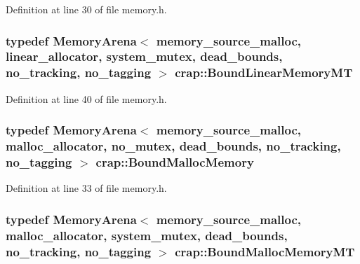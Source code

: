 Definition at line 30 of file memory.\+h.

\hypertarget{namespacecrap_a55259fc8a1932b947a5b796be2f346dc}{
\subsubsection[{Bound\+Linear\+Memory\+M\+T}]{\setlength{\rightskip}{0pt plus 5cm}typedef {\bf Memory\+Arena}$<$ {\bf memory\+\_\+source\+\_\+malloc}, {\bf linear\+\_\+allocator}, {\bf system\+\_\+mutex}, {\bf dead\+\_\+bounds}, {\bf no\+\_\+tracking}, {\bf no\+\_\+tagging} $>$ {\bf crap\+::\+Bound\+Linear\+Memory\+M\+T}}}\label{namespacecrap_a55259fc8a1932b947a5b796be2f346dc}


Definition at line 40 of file memory.\+h.

\hypertarget{namespacecrap_a8d06ec26605b8fbab3675d68bc669a2b}{
\subsubsection[{Bound\+Malloc\+Memory}]{\setlength{\rightskip}{0pt plus 5cm}typedef {\bf Memory\+Arena}$<$ {\bf memory\+\_\+source\+\_\+malloc}, {\bf malloc\+\_\+allocator}, {\bf no\+\_\+mutex}, {\bf dead\+\_\+bounds}, {\bf no\+\_\+tracking}, {\bf no\+\_\+tagging} $>$ {\bf crap\+::\+Bound\+Malloc\+Memory}}}\label{namespacecrap_a8d06ec26605b8fbab3675d68bc669a2b}


Definition at line 33 of file memory.\+h.

\hypertarget{namespacecrap_a0e1ad1a243444e07c558d2553b3949da}{
\subsubsection[{Bound\+Malloc\+Memory\+M\+T}]{\setlength{\rightskip}{0pt plus 5cm}typedef {\bf Memory\+Arena}$<$ {\bf memory\+\_\+source\+\_\+malloc}, {\bf malloc\+\_\+allocator}, {\bf system\+\_\+mutex}, {\bf dead\+\_\+bounds}, {\bf no\+\_\+tracking}, {\bf no\+\_\+tagging} $>$ {\bf crap\+::\+Bound\+Malloc\+Memory\+M\+T}}}\label{namespacecrap_a0e1ad1a243444e07c558d2553b3949da}


